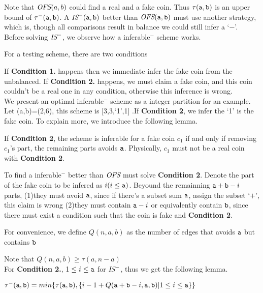 Note that $\text{\it OFS}(a,b)$ could find a real and a fake coin. Thus $\tau(\mathtt{a},\mathtt{b})$ is an upper bound of $\tau^-(\mathtt{a},\mathtt{b})$.
A $\text{\it IS}^-(\mathtt{a},\mathtt{b})$ better than $\text{\it OFS}(\mathtt{a},\mathtt{b})$ must use another strategy, which is, though all comparisons result in balance we could still infer a `$-$'.\\

Before solving $\text{\it IS}^-$, we observe how a inferable$^-$ scheme works.

For a testing scheme, there are two conditions

If \textbf{Condition 1.} happens then we immediate infer the fake coin from the unbalanced.
If \textbf{Condition 2.} happens, we must claim a fake coin, and this coin couldn't be a real one in any condition, otherwise this inference is wrong.\\

We present an optimal inferable$^-$ scheme as a integer partition for an example. Let (a,b)=(2,6), 
this scheme is [3,3,`1',1] .If \textbf{Condition 2}, we infer the `1' is the fake coin. To explain more, we introduce the following lemma.

\begin{lemma}\label{lma:inferable}
If \textbf{Condition 2}, the scheme is inferable for a fake coin $c_1$ if and only if removing $c_1$'s part, the remaining parts avoids $\mathtt{a}$. Physically, $c_1$ must not be a real coin with \textbf{Condition 2}.
\end{lemma}

To find a inferable$^-$ better than $\text{\it OFS}$ must solve \textbf{Condition 2}.
Denote the part of the fake coin to be infered as $i(i\leq\mathtt{a})$. 
Beyound the remainning $\mathtt{a}+\mathtt{b}-i$ parts, 
(1)they must avoid $\mathtt{a}$, since if there's a subset sum $\mathtt{a}$, assign the subset `$+$', this claim is wrong
(2)they must contain $\mathtt{a}-i$ or equivalently contain $\mathtt{b}$, since there must exist a condition such that the coin is fake and \textbf{Condition 2}.


\begin{definition}
For convenience, we define $Q(n,a,b)$ as the number of edges that avoids $\mathtt{a}$ but contains $\mathtt{b}$ 
\end{definition}

Note that $Q(n,a,b)\geq\tau(a,n-a)$\\

For \textbf{Condition 2.}, $1\leq i\leq\mathtt{a}$ for $\text{\it IS}^-$, thus we get the following lemma.

\begin{lemma}
$\tau^-(\mathtt{a},\mathtt{b})=min\{\tau(\mathtt{a},\mathtt{b}), \{i-1+Q(\mathtt{a}+\mathtt{b}-i,\mathtt{a},\mathtt{b}) | 1\leq i\leq\mathtt{a}\} \}$
\end{lemma}

